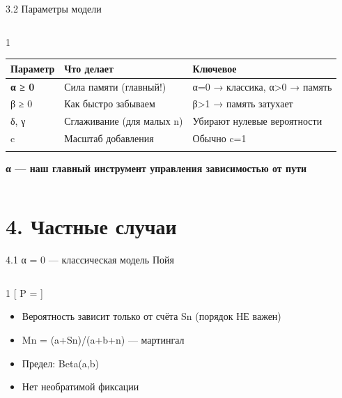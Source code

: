 \documentclass[
  ignorenonframetext,
  aspectratio=169,
  russian,
]{beamer}
\providecommand{\tightlist}{%
  \setlength{\itemsep}{0pt}\setlength{\parskip}{0pt}}
\begin{document}
\begin{frame}{3.2 Параметры модели}
\label{ux43fux430ux440ux430ux43cux435ux442ux440ux44b-ux43cux43eux434ux435ux43bux438}
\begin{columns}[T]
\begin{column}{1\linewidth}
\begin{longtable}[]{@{}lll@{}}
\toprule\noalign{}
Параметр & Что делает & Ключевое \\
\midrule\noalign{}
\endhead
\textbf{α ≥ 0} & Сила памяти (главный!) & α=0 → классика, α\textgreater0
→ память \\
β ≥ 0 & Как быстро забываем & β\textgreater1 → память затухает \\
δ, γ & Сглаживание (для малых n) & Убирают нулевые вероятности \\
c & Масштаб добавления & Обычно c=1 \\
\bottomrule\noalign{}
\end{longtable}

\textbf{α --- наш главный инструмент управления зависимостью от пути}
\end{column}
\end{columns}
\end{frame}

\section{4. Частные
случаи}\label{ux447ux430ux441ux442ux43dux44bux435-ux441ux43bux443ux447ux430ux438}

\begin{frame}{4.1 α = 0 --- классическая модель Пойя}
\label{ux3b1-0-ux43aux43bux430ux441ux441ux438ux447ux435ux441ux43aux430ux44f-ux43cux43eux434ux435ux43bux44c-ux43fux43eux439ux44f}
\begin{columns}[T]
\begin{column}{1\linewidth}
{[} P =  {]}

\begin{itemize}
\tightlist
\item
  Вероятность зависит только от счёта Sn (порядок НЕ важен)
\item
  Mn = (a+Sn)/(a+b+n) --- мартингал
\item
  Предел: Beta(a,b)
\item
  Нет необратимой фиксации
\end{itemize}
\end{column}
\end{columns}
\end{frame}
\end{document}
